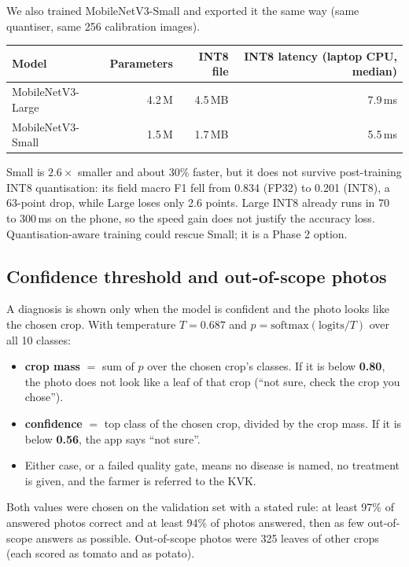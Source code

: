 \documentclass[11pt,a4paper]{article}
\newcommand{\hdr}[1]{\textbf{#1}}
\begin{document}
We also trained MobileNetV3-Small and exported it the same way (same quantiser,
same 256 calibration images).

\begin{table}[H]
\centering
\begin{tabular}{@{}lrrr@{}}
\toprule
\hdr{Model} & \hdr{Parameters} & \hdr{INT8 file} & \hdr{INT8 latency (laptop CPU, median)} \\
\midrule
MobileNetV3-Large & 4.2\,M & 4.5\,MB & 7.9\,ms \\
MobileNetV3-Small & 1.5\,M & 1.7\,MB & 5.5\,ms \\
\bottomrule
\end{tabular}
\end{table}

Small is $2.6\times$ smaller and about 30\% faster, but it does not survive
post-training INT8 quantisation: its field macro F1 fell from 0.834 (FP32) to
0.201 (INT8), a 63-point drop, while Large loses only 2.6 points. Large INT8
already runs in 70 to 300\,ms on the phone, so the speed gain does not justify the
accuracy loss. Quantisation-aware training could rescue Small; it is a Phase 2 option.

\subsection{Confidence threshold and out-of-scope photos}

A diagnosis is shown only when the model is confident and the photo looks like the
chosen crop. With temperature $T = 0.687$ and
$p = \mathrm{softmax}(\mathrm{logits}/T)$ over all 10 classes:

\begin{itemize}
  \item \textbf{crop mass} $=$ sum of $p$ over the chosen crop's classes. If it is
        below \textbf{0.80}, the photo does not look like a leaf of that crop
        (``not sure, check the crop you chose'').
  \item \textbf{confidence} $=$ top class of the chosen crop, divided by the crop
        mass. If it is below \textbf{0.56}, the app says ``not sure''.
  \item Either case, or a failed quality gate, means no disease is named, no
        treatment is given, and the farmer is referred to the KVK.
\end{itemize}

Both values were chosen on the validation set with a stated rule: at least 97\% of
answered photos correct and at least 94\% of photos answered, then as few
out-of-scope answers as possible. Out-of-scope photos were 325 leaves of other
crops (each scored as tomato and as potato).
\end{document}
